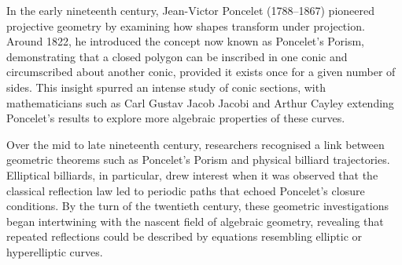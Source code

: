 \begin{historical}
In the early nineteenth century, Jean-Victor Poncelet (1788–1867) pioneered projective geometry by examining how shapes transform under projection. Around 1822, he introduced the concept now known as Poncelet’s Porism, demonstrating that a closed polygon can be inscribed in one conic and circumscribed about another conic, provided it exists once for a given number of sides. This insight spurred an intense study of conic sections, with mathematicians such as Carl Gustav Jacob Jacobi and Arthur Cayley extending Poncelet’s results to explore more algebraic properties of these curves.

Over the mid to late nineteenth century, researchers recognised a link between geometric theorems such as Poncelet’s Porism and physical billiard trajectories. Elliptical billiards, in particular, drew interest when it was observed that the classical reflection law led to periodic paths that echoed Poncelet’s closure conditions. By the turn of the twentieth century, these geometric investigations began intertwining with the nascent field of algebraic geometry, revealing that repeated reflections could be described by equations resembling elliptic or hyperelliptic curves.


\end{historical}